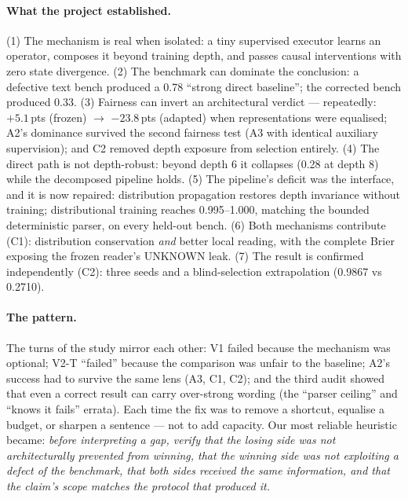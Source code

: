 \documentclass[11pt,a4paper]{article}
\begin{document}
\paragraph{What the project established.} (1) The mechanism is real when isolated: a tiny supervised executor learns an operator, composes it beyond training depth, and passes causal interventions with zero state divergence. (2) The benchmark can dominate the conclusion: a defective text bench produced a 0.78 ``strong direct baseline''; the corrected bench produced 0.33. (3) Fairness can invert an architectural verdict --- repeatedly: $+5.1$\,pts (frozen) $\to$ $-23.8$\,pts (adapted) when representations were equalised; A2's dominance survived the second fairness test (A3 with identical auxiliary supervision); and C2 removed depth exposure from selection entirely. (4) The direct path is not depth-robust: beyond depth 6 it collapses (0.28 at depth 8) while the decomposed pipeline holds. (5) The pipeline's deficit was the interface, and it is now repaired: distribution propagation restores depth invariance without training; distributional training reaches 0.995--1.000, matching the bounded deterministic parser, on every held-out bench. (6) Both mechanisms contribute (C1): distribution conservation \emph{and} better local reading, with the complete Brier exposing the frozen reader's UNKNOWN leak. (7) The result is confirmed independently (C2): three seeds and a blind-selection extrapolation (0.9867 vs 0.2710).

\paragraph{The pattern.} The turns of the study mirror each other: V1 failed because the mechanism was optional; V2-T ``failed'' because the comparison was unfair to the baseline; A2's success had to survive the same lens (A3, C1, C2); and the third audit showed that even a correct result can carry over-strong wording (the ``parser ceiling'' and ``knows it fails'' errata). Each time the fix was to remove a shortcut, equalise a budget, or sharpen a sentence --- not to add capacity. Our most reliable heuristic became: \emph{before interpreting a gap, verify that the losing side was not architecturally prevented from winning, that the winning side was not exploiting a defect of the benchmark, that both sides received the same information, and that the claim's scope matches the protocol that produced it.}
\end{document}
